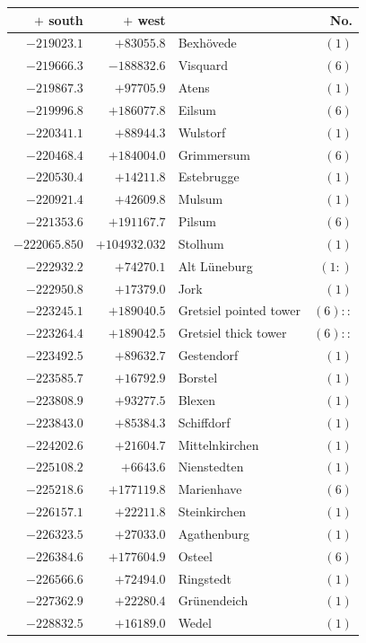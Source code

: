 \begin{center}\begingroup\fontsize{8}{9}\selectfont
\setlength{\tabcolsep}{4pt}
\begin{tabular}{r|r|p{170pt}|r}\hline
\(+\) south&\(+\) west&&No.\\\hline
\(-219023.1\)&\(+83055.8\)&Bexhövede&\((1)\)\\
\(-219666.3\)&\(-188832.6\)&Visquard&\((6)\)\\
\(-219867.3\)&\(+97705.9\)&Atens&\((1)\)\\
\(-219996.8\)&\(+186077.8\)&Eilsum&\((6)\)\\
\(-220341.1\)&\(+88944.3\)&Wulstorf&\((1)\)\\
\(-220468.4\)&\(+184004.0\)&Grimmersum&\((6)\)\\
\(-220530.4\)&\(+14211.8\)&Estebrugge&\((1)\)\\
\(-220921.4\)&\(+42609.8\)&Mulsum&\((1)\)\\
\(-221353.6\)&\(+191167.7\)&Pilsum&\((6)\)\\
\(-222065.850\)&\(+104932.032\)&Stolhum&\((1)\)\\
\(-222932.2\)&\(+74270.1\)&Alt Lüneburg&\((1:)\)\\
\(-222950.8\)&\(+17379.0\)&Jork&\((1)\)\\
\(-223245.1\)&\(+189040.5\)&Gretsiel pointed tower&\((6)::\)\\
\(-223264.4\)&\(+189042.5\)&Gretsiel thick tower&\((6)::\)\\
\(-223492.5\)&\(+89632.7\)&Gestendorf&\((1)\)\\
\(-223585.7\)&\(+16792.9\)&Borstel&\((1)\)\\
\(-223808.9\)&\(+93277.5\)&Blexen&\((1)\)\\
\(-223843.0\)&\(+85384.3\)&Schiffdorf&\((1)\)\\
\(-224202.6\)&\(+21604.7\)&Mittelnkirchen&\((1)\)\\
\(-225108.2\)&\(+6643.6\)&Nienstedten&\((1)\)\\
\(-225218.6\)&\(+177119.8\)&Marienhave&\((6)\)\\
\(-226157.1\)&\(+22211.8\)&Steinkirchen&\((1)\)\\
\(-226323.5\)&\(+27033.0\)&Agathenburg&\((1)\)\\
\(-226384.6\)&\(+177604.9\)&Osteel&\((6)\)\\
\(-226566.6\)&\(+72494.0\)&Ringstedt&\((1)\)\\
\(-227362.9\)&\(+22280.4\)&Grünendeich&\((1)\)\\
\(-228832.5\)&\(+16189.0\)&Wedel&\((1)\)\\

\end{tabular}
\end{center}
